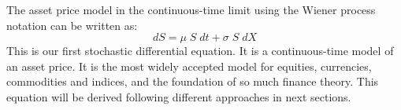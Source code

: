 The asset price model in the continuous-time limit using the Wiener process notation can be written as:
\begin{equation}
    dS = \mu \; S \; dt + \sigma \; S \; dX
\end{equation}
This is our first stochastic differential equation. It is a continuous-time model of an asset price. It is the most widely accepted model for equities, currencies, commodities and indices, and the foundation of so much finance theory. This equation will be derived following different approaches in next sections.


